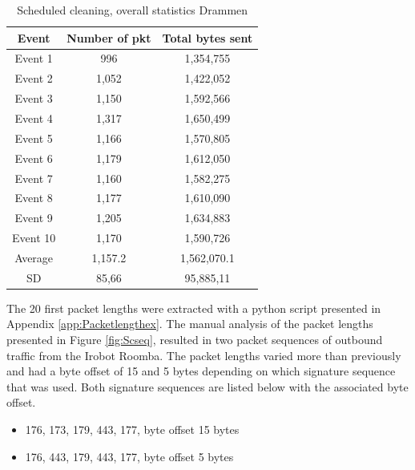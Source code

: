 \begin{table}[H]
\centering
\caption{Scheduled cleaning, overall statistics Drammen}
\label{tab:scoverallDRA}
\begin{tabular}{|c|c|c|}
\hline
\textbf{Event} & \textbf{Number of pkt} & \textbf{Total bytes sent} \\ \hline
Event 1        & 996                    & 1,354,755                   \\ \hline
Event 2        & 1,052                   & 1,422,052                   \\ \hline
Event 3        & 1,150                   & 1,592,566                   \\ \hline
Event 4        & 1,317                   & 1,650,499                   \\ \hline
Event 5        & 1,166                   & 1,570,805                   \\ \hline
Event 6        & 1,179                   & 1,612,050                   \\ \hline
Event 7        & 1,160                   & 1,582,275                   \\ \hline
Event 8        & 1,177                   & 1,610,090                   \\ \hline
Event 9        & 1,205                   & 1,634,883                   \\ \hline
Event 10       & 1,170                   & 1,590,726                   \\ \hline
Average        & 1,157.2                 & 1,562,070.1                 \\ \hline
SD        & 85,66
       & 95,885,11               \\ \hline
\end{tabular}
\end{table}

The 20 first packet lengths were extracted with a python script presented in Appendix \ref{app:Packetlengthex}. The manual analysis of the packet lengths presented in Figure \ref{fig:Scseq}, resulted in two packet sequences of outbound traffic from the Irobot Roomba. The packet lengths varied more than previously and had a byte offset of 15 and 5 bytes depending on which signature sequence that was used. Both signature sequences are listed below with the associated byte offset. 

\begin{itemize}
    \item 176, 173, 179, 443, 177, byte offset 15 bytes 
    \item 176, 443, 179, 443, 177, byte offset 5 bytes
\end{itemize}

